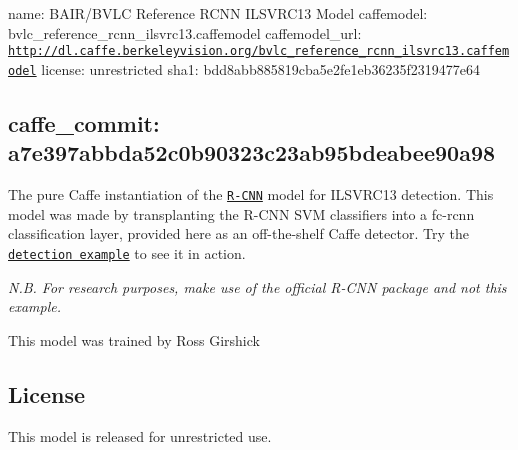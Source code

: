 

 name\+: B\+A\+I\+R/\+B\+V\+LC Reference R\+C\+NN I\+L\+S\+V\+R\+C13 Model caffemodel\+: bvlc\+\_\+reference\+\_\+rcnn\+\_\+ilsvrc13.\+caffemodel caffemodel\+\_\+url\+: \href{http://dl.caffe.berkeleyvision.org/bvlc_reference_rcnn_ilsvrc13.caffemodel}{\tt http\+://dl.\+caffe.\+berkeleyvision.\+org/bvlc\+\_\+reference\+\_\+rcnn\+\_\+ilsvrc13.\+caffemodel} license\+: unrestricted sha1\+: bdd8abb885819cba5e2fe1eb36235f2319477e64 \subsection*{caffe\+\_\+commit\+: a7e397abbda52c0b90323c23ab95bdeabee90a98 }

The pure Caffe instantiation of the \href{https://github.com/rbgirshick/rcnn}{\tt R-\/\+C\+NN} model for I\+L\+S\+V\+R\+C13 detection. This model was made by transplanting the R-\/\+C\+NN S\+VM classifiers into a {\ttfamily fc-\/rcnn} classification layer, provided here as an off-\/the-\/shelf Caffe detector. Try the \href{http://nbviewer.ipython.org/github/BVLC/caffe/blob/master/examples/detection.ipynb}{\tt detection example} to see it in action.

{\itshape N.\+B. For research purposes, make use of the official R-\/\+C\+NN package and not this example.}

This model was trained by Ross Girshick 

\subsection*{License}

This model is released for unrestricted use. 